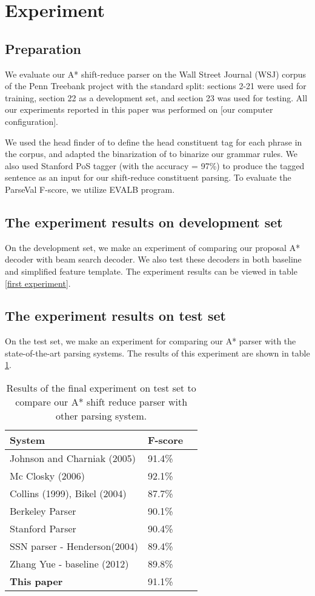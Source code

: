 \section{Experiment}
\subsection{Preparation}
We evaluate our A* shift-reduce parser on the Wall Street Journal (WSJ) corpus of the Penn Treebank project with the standard split: sections 2-21 were used for training, section 22 as a development set, and section 23 was used for testing. All our experiments reported in this paper was performed on [our computer configuration].

We used the head finder of \cite{ref:1999Collins} to define the head constituent tag for each phrase in the corpus, and adapted the binarization of \cite{ref:2009Zhang} to binarize our grammar rules. We also used Stanford PoS tagger (with the accuracy = 97\%) to produce the tagged sentence as an input for our shift-reduce constituent parsing. To evaluate the ParseVal F-score, we utilize EVALB program.

\subsection{The experiment results on development set}
On the development set, we make an experiment of comparing our proposal A* decoder with beam search decoder. We also test these decoders in both baseline and simplified feature template. The experiment results can be viewed in table \ref{first experiment}.

\subsection{The experiment results on test set}
On the test set, we make an experiment for comparing our A* parser with the state-of-the-art parsing systems. The results of this experiment are shown in table \ref{second experiment}.
\begin{table}
	\begin{center}
		\caption{\label{second experiment} Results of the final experiment on test set to compare our A* shift reduce parser with other parsing system.}
		\begin{tabular}{|l|l|l|}
			\hline \bf System & \bf F-score \\ \hline
			Johnson and Charniak (2005) & 91.4\% \\
			Mc Closky (2006) & 92.1\%\\
			Collins (1999), Bikel (2004) & 87.7\% \\
			Berkeley Parser & 90.1\%  \\
			Stanford Parser &  90.4\% \\
			SSN parser - Henderson(2004) & 89.4\%  \\
			Zhang Yue - baseline (2012) & 89.8\% \\
			\textbf{This paper} & 91.1\% \\
			\hline
		\end{tabular}
	\end{center}
\end{table}

